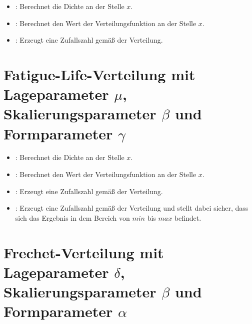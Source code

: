 \begin{itemize}

\item
{}:
Berechnet die Dichte an der Stelle $x$.

\item
{}:
Berechnet den Wert der Verteilungsfunktion an der Stelle $x$.

\item
{}:
Erzeugt eine Zufallszahl gemäß der Verteilung.

\end{itemize}



\section{Fatigue-Life-Verteilung mit Lageparameter \texorpdfstring{$\mu$}{mu}, Skalierungsparameter \texorpdfstring{$\beta$}{beta} und Formparameter \texorpdfstring{$\gamma$}{gamma}}

\begin{itemize}

\item
{}:
Berechnet die Dichte an der Stelle $x$.

\item
{}:
Berechnet den Wert der Verteilungsfunktion an der Stelle $x$.

\item
{}:
Erzeugt eine Zufallszahl gemäß der Verteilung.

\item
{}:
Erzeugt eine Zufallszahl gemäß der Verteilung und stellt dabei sicher, dass sich das Ergebnis in dem Bereich von $min$ bis $max$ befindet.

\end{itemize}



\section{Frechet-Verteilung mit Lageparameter \texorpdfstring{$\delta$}{delta}, Skalierungsparameter \texorpdfstring{$\beta$}{beta} und Formparameter \texorpdfstring{$\alpha$}{alpha}}

